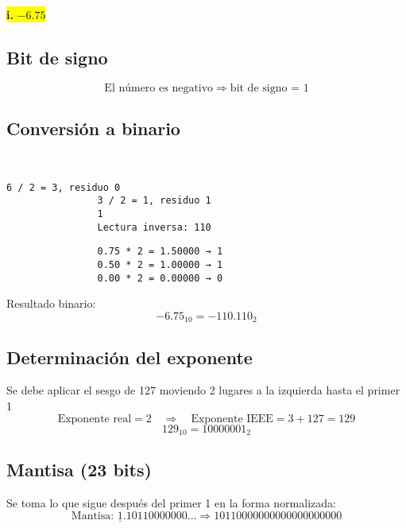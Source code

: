 \documentclass[a4paper,12pt]{article}
\begin{document}
		\begin{center}	
		\colorbox{yellow}{{\textbf{i.} $-6.75$}}
		
		\subsection*{Bit de signo}
		
		\[
		\text{El número es negativo} \Rightarrow \text{bit de signo = } \boxed{1}
		\]
		
		\subsection*{Conversión a binario}
		
		
		~~~~ 
		\begin{center}
			\begin{Verbatim}[formatcom=\centering]
				6 / 2 = 3, residuo 0
				3 / 2 = 1, residuo 1
				1 
				Lectura inversa: 110
			\end{Verbatim}
		\end{center}
		
		
		\begin{center}
			\begin{Verbatim}
				0.75 * 2 = 1.50000 → 1 
				0.50 * 2 = 1.00000 → 1
				0.00 * 2 = 0.00000 → 0
			\end{Verbatim}
		\end{center}
		
		Resultado binario: 
		\[
		-6.75_{10} = -110.110_2
		\]
		
		\subsection*{Determinación del exponente}
		
		Se debe aplicar el sesgo de 127 moviendo 2 lugares a la izquierda hasta el primer 1
		\vspace{-0.5em}
		\[
		\text{Exponente real} = 2 \quad \Rightarrow \quad \text{Exponente IEEE} = 3 + 127 = 129
		\]
		\vspace{-0.5em}
		\[
		129_{10} = 10000001_2
		\]
		
		\subsection*{Mantisa (23 bits)}
		
		Se toma lo que sigue después del primer 1 en la forma normalizada:
		\vspace{-0.5em}
		\[
		\text{Mantisa: } \underline{1}.10110000000... \Rightarrow 10110000000000000000000
		\]
		

\end{center}
\end{document}
